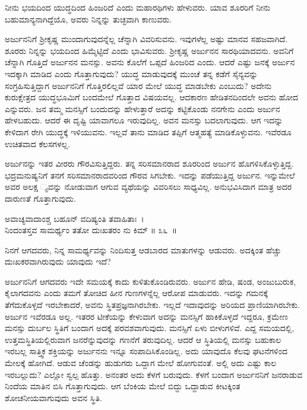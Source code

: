 \begin{artha}
ನೀನು ಭಯದಿಂದ ಯುದ್ಧದಿಂದ ಹಿಂಜರಿದೆ ಎಂದು ಮಹಾರಥಿಗಳು ಹೇಳುವರು. ಯಾವ ಶೂರರಿಗೆ ನೀನು ಬಹುಮಾನ್ಯನಾಗಿದ್ದೆಯೊ, ಅವರು ನಿನ್ನನ್ನು ತುಚ್ಛವಾಗಿ ಕಾಣುವರು.
\end{artha}

ಅರ್ಜುನನಿಗೆ ಶ‍್ರೀಕೃಷ್ಣ ಮುಂದಾಗುವುದನ್ನೆಲ್ಲ ಚೆನ್ನಾಗಿ ವಿವರಿಸುವನು. ಇವುಗಳೆಲ್ಲ ಅಷ್ಟು ಮಾನವ ಸಹಜವಾಗಿದೆ. ಶೂರರು ನಿನ್ನನ್ನು ಭಯದಿಂದ ಹಿಮ್ಮೆಟ್ಟಿದೆ ಎಂದು ಭಾವಿಸುವರು. ಶ‍್ರೀಕೃಷ್ಣ ಅರ್ಜುನನ ಸಾರಥಿಯಾದವನು. ಅವನಿಗೆ ಚೆನ್ನಾಗಿ ಗೊತ್ತಿದೆ ಅರ್ಜುನನ ಮನಸ್ಸು. ಅವನು ಕೊಲೆಗೆ ಒಪ್ಪದೆ ಹಿಂಜರಿದ ಎಂದು. ಆದರೆ ಎಷ್ಟು ಜನಕ್ಕೆ ಅರ್ಜುನ ಇದಕ್ಕಾಗಿ ಮಾಡಿದ ಎಂದು ಗೊತ್ತಾಗುವುದು? ಯುದ್ಧ ಮಾಡುವುದಕ್ಕೆ ಮುಂಚೆ ತನ್ನ ಕಡೆಗೆ ಸೈನ್ಯವನ್ನು ಸಂಗ್ರಹಿಸುತ್ತಿದ್ದಾಗ ಅರ್ಜುನನಿಗೆ ಗೊತ್ತಿರಲಿಲ್ಲವೆ ಯಾರ ಮೇಲೆ ಯುದ್ಧ ಮಾಡಬೇಕು ಎಂಬುದು? ಅದೇನು ಕುರುಕ್ಷೇತ್ರದ ಯುದ್ಧಭೂಮಿಗೆ ಬಂದಮೇಲೆ ಗೊತ್ತಾದ ವಿಷಯವಲ್ಲ. ಆದಕಾರಣ ಹೇಡಿತನದಿಂದಲೇ ಅವನು ಹೋದ ಎನ್ನುವರು. ಜನ ತಮ್ಮ ಮನಸ್ಸಿಗೆ ಬಂದುದನ್ನು ಹೇಳುತ್ತಾರೆ ಅದನ್ನು ಕಟ್ಟಿಕೊಂಡು ನನಗೇನು ಎಂದು ಅರ್ಜುನ ಹೇಳಬಹುದು. ಆದರೆ ಈ ದೃಷ್ಟಿ ಯಾವಾಗಲೂ ಇರುವುದಿಲ್ಲ. ಅವನ ಮನಸ್ಸು ಬದಲಾಗುವುದು. ಆಗ ಇದನ್ನು ಕೇಳಿದಾಗ ರೇಗಿ ಯುದ್ಧಕ್ಕೆ ಇಳಿಯುವನು. ಇಲ್ಲವೆ ತಾನು ಮಾಡಿದ ತಪ್ಪಿಗೆ ಆತ್ಮಹತ್ಯೆ ಮಾಡಿಕೊಳ್ಳುವನು. ಇವೆರಡೂ ಉಚಿತವಾದ ಕೆಲಸಗಳಲ್ಲ. 

ಅರ್ಜುನನ್ನು ಇತರ ವೀರರು ಗೌರವಿಸುತ್ತಿದ್ದರು. ತನ್ನ ಸರಿಸಮಾನರಾದ ಶೂರರಿಂದ ಅರ್ಜುನ ಹೊಗಳಿಸಿಕೊಳ್ಳುತ್ತಿದ್ದ. ಭದ್ರಮನುಷ್ಯನಿಗೆ ತನಗೆ ಸರಿಸಮಾನರಾದವರಿಂದ ಗೌರವ ಸಿಗಬೇಕು. ಇದನ್ನು ಪಡೆಯುತ್ತಿದ್ದ ಅರ್ಜುನ. ಇನ್ನುಮೇಲೆ ಅವರ ಅಲಕ್ಷ ್ಯವನ್ನು ನೋಡುವಾಗ ಆಗುವ ವ್ಯಥೆಯನ್ನು ವಿವರಿಸಲು ಸಾಧ್ಯವಿಲ್ಲ. ಅನುಭವಿಸಿದಾಗ ಮಾತ್ರ ಅದರ ದಾರುಣತೆ ಗೊತ್ತಾಗುವುದು.

\begin{shloka}
ಅವಾಚ್ಯವಾದಾಂಶ್ಚ ಬಹೂನ್ ವದಿಷ್ಯಂತಿ ತವಾಹಿತಾಃ~।\\ನಿಂದಂತಸ್ತವ ಸಾಮರ್ಥ್ಯಂ ತತೋ ದುಃಖತರಂ ನು ಕಿಮ್ \hfill॥ ೩೬~॥
\end{shloka}

\begin{artha}
ನಿನಗೆ ಆಗದವರು, ನಿನ್ನ ಸಾಮರ್ಥ್ಯವನ್ನು ನಿಂದಿಸುತ್ತ ಆಡಬಾರದ ಮಾತುಗಳನ್ನು ಆಡುವರು. ಅದಕ್ಕಿಂತ ಹೆಚ್ಚು ದುಃಖಕರವಾಗಿರುವುದು ಯಾವುದು ಇದೆ?
\end{artha}

ಅರ್ಜುನನಿಗೆ ಆಗದವರು ಇದೇ ಸಮಯಕ್ಕೆ ಕಾದು ಕುಳಿತುಕೊಂಡಿರುವರು. ಅರ್ಜುನ ಹೇಡಿ, ಷಂಡ, ಅಂಜುಬುರುಕ, ಕೈಲಾಗದವನು ಎಂದು ತಮಗೆ ತೋಚಿದ ಹೀನ ಗುಣಗಳನ್ನೆಲ್ಲ ಆರೋಪ ಮಾಡುವರು. ಇದನ್ನು ಗಮನಕ್ಕೆ ತೆಗೆದುಕೊಳ್ಳದೆ ಇರಬೇಕಾದರೆ, ಅವನು ಸ್ಥಿತಪ್ರಜ್ಞನಾಗಿರಬೇಕು. ಇಲ್ಲದೆ ಇದಾವುದನ್ನು ಅರಿಯದ ಪ್ರಾಣಿಯಾಗಿರಬೇಕು. ಅರ್ಜುನ ಇವೆರಡೂ ಅಲ್ಲ. ಇತರರ ಟೀಕೆಯನ್ನು ಕೇಳುವಾಗ ಅದನ್ನು ಮನಸ್ಸಿಗೆ ಹಾಕಿಕೊಳ್ಳದೆ ಇದ್ದರೂ, ಕ್ರಮೇಣ ಮನಸ್ಸು ದುರ್ಬಲ ಸ್ಥಿತಿಗೆ ಬಂದಾಗ ಅದಕ್ಕೆ ಪರವಶವಾಗುವುದು. ಮನಸ್ಸಿಗೆ ಏಳು ಬೀಳುಗಳಿವೆ. ಎದ್ದ ಸಮಯದಲ್ಲಿ, ಉತ್ತಮಸ್ಥಿತಿಯಲ್ಲಿರುವಾಗ ಜನರೆನ್ನುವುದನ್ನು ಗಣನೆಗೆ ತರುವುದಿಲ್ಲ. ಆದರೆ ಆ ಸ್ಥಿತಿಯಲ್ಲಿ ಮನಸ್ಸು ಬಹುಕಾಲ ಇರಬಲ್ಲ ಸಾತ್ತ್ವಿಕ ಶಕ್ತಿಯನ್ನು ಅರ್ಜುನನು ಇನ್ನೂ ಸಂಪಾದಿಸಿಕೊಂಡಿಲ್ಲ. ಅದು ಯಾವುದೊ ಕೆಲವು ಘಟನೆಗಳಿಂದ ಮೇಲಕ್ಕೆ ಹೋಗಿದೆ. ಆಡುವ ಚೆಂಡನ್ನು ಹುಡುಗರು ಒದ್ದಾಗ ಮೇಲೆ ಹೋಗುವಂತೆ. ಅಲ್ಲಿ ಅದು ಎಷ್ಟು ಕಾಲ ಇರಬಲ್ಲುದು? ಎಲ್ಲೋ ಸ್ವಲ್ಪ ಹೊತ್ತು. ಅನಂತರ ಅದು ಕೆಳಗೆ ಬರುವುದು. ಕೆಳಗೆ ಬಂದಾಗ ಅರ್ಜುನನಿಗೆ ಜನರಾಡುವ ನಿಂದೆಯ ಮಾತಿನ ಬಿಸಿ ಗೊತ್ತಾಗುವುದು. ಆಗ ಬೆಂಕಿಯ ಮೇಲೆ ಬಿದ್ದು ಒದ್ದಾಡುವ ಕೀಟಕ್ಕಿಂತ ಶೋಚನೀಯವಾಗುವುದು ಅವನ ಸ್ಥಿತಿ.

